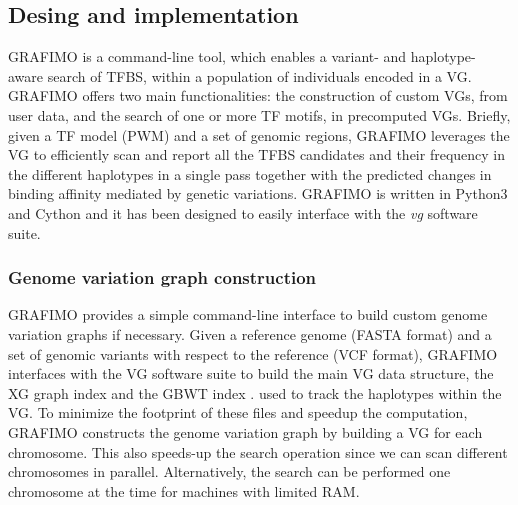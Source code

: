 \documentclass[a4paper, titlepage, openright]{book}
\newcommand{\grafimo}{GRAFIMO\xspace}
\begin{document}
\subsection{Desing and implementation}
\grafimo is a command-line tool, which enables a variant- and haplotype- aware search of TFBS, within a population of individuals encoded in a VG. \grafimo offers two main functionalities: the construction of custom VGs, from user data, and the search of one or more TF motifs, in precomputed VGs. Briefly, given a TF model (PWM) and a set of genomic regions, \grafimo leverages the VG to efficiently scan and report all the TFBS candidates and their frequency in the different haplotypes in a single pass together with the predicted changes in binding affinity mediated by genetic variations. \grafimo is written in Python3 and Cython and it has been designed to easily interface with the \textit{vg} software suite.
\subsubsection{Genome variation graph construction}
\grafimo provides a simple command-line interface to build custom genome variation graphs if necessary. Given a reference genome (FASTA format) and a set of genomic variants with respect to the reference (VCF format), \grafimo interfaces with the VG software suite to build the main VG data structure, the XG graph index \citep{garrison2018variation} and the GBWT index \citep{novak2017graph}. used to track the haplotypes within the VG. To minimize the footprint of these files and speedup the computation, \grafimo constructs the genome variation graph by building a VG for each chromosome. This also speeds-up the search operation since we can scan different chromosomes in parallel. Alternatively, the search can be performed one chromosome at the time for machines with limited RAM.
\end{document}
